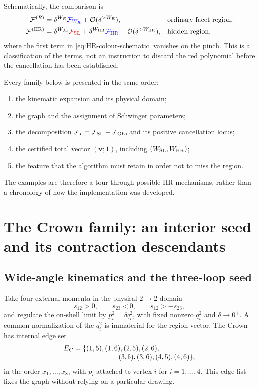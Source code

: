 \documentclass[a4paper,11pt]{article}
\newcommand{\HR}{\mathrm{HR}}
\newcommand{\FSL}{\mathcal F_{\rm SL}}
\newcommand{\FObs}{\mathcal F_{\rm Obs}}
\newcommand{\WSL}{W_{\rm SL}}
\newcommand{\WHR}{W_{\rm HR}}
\newcommand{\SLcolour}[1]{{\color{red}#1}}
\newcommand{\HRcolour}[1]{{\color{blue}#1}}
\newcommand{\Othercolour}[1]{{\color{black}#1}}
\begin{document}
Schematically, the comparison is
\begin{align}
 \mathcal F^{(R)}
 &=\delta^{W_R}\HRcolour{\mathcal F_{W_R}}
   +\Othercolour{\mathcal O(\delta^{>W_R})},
 &&\text{ordinary facet region},
\label{eq:facet-colour-schematic}\\
 \mathcal F^{(\HR)}
 &=\delta^{\WSL}\SLcolour{\FSL}
   +\delta^{\WHR}\HRcolour{\mathcal F_{\HR}}
   +\Othercolour{\mathcal O(\delta^{>\WHR})},
 &&\text{hidden region},
\label{eq:HR-colour-schematic}
\end{align}
where the first term in \eqref{eq:HR-colour-schematic} vanishes on the pinch.
This is a classification of the terms, not an instruction to discard the
red polynomial before the cancellation has been established.

Every family below is presented in the same order:
\begin{enumerate}[label=(\roman*)]
 \item the kinematic expansion and its physical domain;
 \item the graph and the assignment of Schwinger parameters;
 \item the decomposition \(\mathcal F_\star=\FSL+\FObs\) and its positive
 cancellation locus;
 \item the certified total vector \((\boldsymbol v;1)\), including
 \((\WSL,\WHR)\);
 \item the feature that the algorithm must retain in order not to miss the
 region.
\end{enumerate}
The examples are therefore a tour through possible HR mechanisms, rather
than a chronology of how the implementation was developed.

\section{The Crown family: an interior seed and its contraction descendants}
\label{sec:example-crown}

\subsection{Wide-angle kinematics and the three-loop seed}

Take four external momenta in the physical \(2\to2\) domain
\begin{equation}
 s_{12}>0,\qquad s_{23}<0,\qquad s_{12}>-s_{23},
 \label{eq:crown-domain}
\end{equation}
and regulate the on-shell limit by \(p_i^2=\delta q_i^2\), with fixed
nonzero \(q_i^2\) and \(\delta\to0^+\).  A common normalization of the
\(q_i^2\) is immaterial for the region vector.  The Crown has internal edge
set
\begin{equation}
 \begin{split}
 E_C={}&\{(1,5),(1,6),(2,5),(2,6),\\[-1mm]
       &\hspace{18mm}(3,5),(3,6),(4,5),(4,6)\},
 \end{split}
 \label{eq:crown-edges}
\end{equation}
in the order \(x_1,\ldots,x_8\), with \(p_i\) attached to vertex \(i\) for
\(i=1,\ldots,4\).  This edge list fixes the graph without relying on a
particular drawing.
\end{document}
